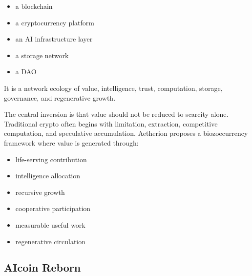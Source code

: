 ﻿\documentclass[12pt]{article}
\begin{document}
\begin{itemize}
  \item a blockchain
\end{itemize}
\begin{itemize}
  \item a cryptocurrency platform
\end{itemize}
\begin{itemize}
  \item an AI infrastructure layer
\end{itemize}
\begin{itemize}
  \item a storage network
\end{itemize}
\begin{itemize}
  \item a DAO
\end{itemize}

It is a network ecology of value, intelligence, trust, computation, storage, governance, and regenerative growth.

The central inversion is that value should not be reduced to scarcity alone. Traditional crypto often begins with limitation, extraction, competitive computation, and speculative accumulation. Aetherion proposes a biozoecurrency framework where value is generated through:

\begin{itemize}
  \item life-serving contribution
\end{itemize}
\begin{itemize}
  \item intelligence allocation
\end{itemize}
\begin{itemize}
  \item recursive growth
\end{itemize}
\begin{itemize}
  \item cooperative participation
\end{itemize}
\begin{itemize}
  \item measurable useful work
\end{itemize}
\begin{itemize}
  \item regenerative circulation
\end{itemize}

\subsection{AIcoin Reborn}
\end{document}
